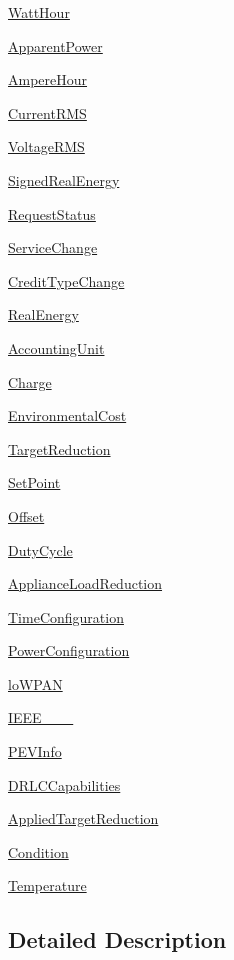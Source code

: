 \begin{DoxyCompactItemize}
\hyperlink{group__WattHour}{Watt\+Hour}
\item 
\hyperlink{group__ApparentPower}{Apparent\+Power}
\item 
\hyperlink{group__AmpereHour}{Ampere\+Hour}
\item 
\hyperlink{group__CurrentRMS}{Current\+R\+MS}
\item 
\hyperlink{group__VoltageRMS}{Voltage\+R\+MS}
\item 
\hyperlink{group__SignedRealEnergy}{Signed\+Real\+Energy}
\item 
\hyperlink{group__RequestStatus}{Request\+Status}
\item 
\hyperlink{group__ServiceChange}{Service\+Change}
\item 
\hyperlink{group__CreditTypeChange}{Credit\+Type\+Change}
\item 
\hyperlink{group__RealEnergy}{Real\+Energy}
\item 
\hyperlink{group__AccountingUnit}{Accounting\+Unit}
\item 
\hyperlink{group__Charge}{Charge}
\item 
\hyperlink{group__EnvironmentalCost}{Environmental\+Cost}
\item 
\hyperlink{group__TargetReduction}{Target\+Reduction}
\item 
\hyperlink{group__SetPoint}{Set\+Point}
\item 
\hyperlink{group__Offset}{Offset}
\item 
\hyperlink{group__DutyCycle}{Duty\+Cycle}
\item 
\hyperlink{group__ApplianceLoadReduction}{Appliance\+Load\+Reduction}
\item 
\hyperlink{group__TimeConfiguration}{Time\+Configuration}
\item 
\hyperlink{group__PowerConfiguration}{Power\+Configuration}
\item 
\hyperlink{group__loWPAN}{lo\+W\+P\+AN}
\item 
\hyperlink{group__IEEE__802__15__4}{I\+E\+E\+E\+\_\+\_\+\_}
\item 
\hyperlink{group__PEVInfo}{P\+E\+V\+Info}
\item 
\hyperlink{group__DRLCCapabilities}{D\+R\+L\+C\+Capabilities}
\item 
\hyperlink{group__AppliedTargetReduction}{Applied\+Target\+Reduction}
\item 
\hyperlink{group__Condition}{Condition}
\item 
\hyperlink{group__Temperature}{Temperature}
\end{DoxyCompactItemize}


\subsection{Detailed Description}
